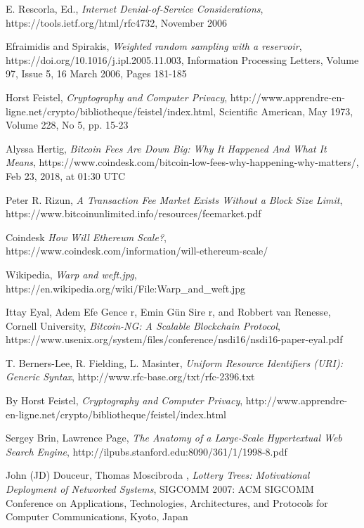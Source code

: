 \documentclass{article}
\begin{document}
\begin{thebibliography}{1}
    E. Rescorla, Ed.,
    \textit{Internet Denial-of-Service Considerations},
    https://tools.ietf.org/html/rfc4732,
    November 2006

    Efraimidis and Spirakis,
    \textit{Weighted random sampling with a reservoir},
    https://doi.org/10.1016/j.ipl.2005.11.003,
    Information Processing Letters,
    Volume 97, Issue 5, 16 March 2006, Pages 181-185

    Horst Feistel,
    \textit{Cryptography and Computer Privacy},
    http://www.apprendre-en-ligne.net/crypto/bibliotheque/feistel/index.html,
    Scientific American, May 1973, Volume 228, No 5, pp. 15-23

    Alyssa Hertig,
    \textit{Bitcoin Fees Are Down Big: Why It Happened And What It Means},
    https://www.coindesk.com/bitcoin-low-fees-why-happening-why-matters/,
    Feb 23, 2018, at 01:30 UTC

    Peter R. Rizun,
    \textit{A Transaction Fee Market Exists Without a Block Size Limit},
    https://www.bitcoinunlimited.info/resources/feemarket.pdf

    Coindesk
    \textit{How Will Ethereum Scale?},
    https://www.coindesk.com/information/will-ethereum-scale/

    Wikipedia,
    \textit{Warp and weft.jpg},
    https://en.wikipedia.org/wiki/File:Warp\_and\_weft.jpg

    Ittay Eyal, Adem Efe Gence r, Emin Gün Sire r, and Robbert van Renesse, Cornell University,
    \textit{Bitcoin-NG: A Scalable Blockchain Protocol},
    https://www.usenix.org/system/files/conference/nsdi16/nsdi16-paper-eyal.pdf

    T. Berners-Lee, R. Fielding, L. Masinter,
    \textit{Uniform Resource Identifiers (URI): Generic Syntax},
    http://www.rfc-base.org/txt/rfc-2396.txt

    By Horst Feistel,
    \textit{Cryptography and Computer Privacy},
    http://www.apprendre-en-ligne.net/crypto/bibliotheque/feistel/index.html

    Sergey Brin, Lawrence Page,
    \textit{The Anatomy of a Large-Scale Hypertextual
Web Search Engine},
    http://ilpubs.stanford.edu:8090/361/1/1998-8.pdf

     John (JD) Douceur, Thomas Moscibroda ,
    \textit{Lottery Trees: Motivational Deployment of Networked Systems},
    SIGCOMM 2007: ACM SIGCOMM Conference on Applications, Technologies,
    Architectures, and Protocols for Computer Communications, Kyoto, Japan 

\end{thebibliography}
\end{document}
